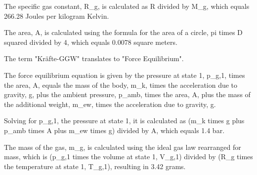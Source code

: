 The specific gas constant, R_g, is calculated as R divided by M_g, which equals 266.28 Joules per kilogram Kelvin.

The area, A, is calculated using the formula for the area of a circle, pi times D squared divided by 4, which equals 0.0078 square meters.

The term "Kräfte-GGW" translates to "Force Equilibrium".

The force equilibrium equation is given by the pressure at state 1, p_{g,1}, times the area, A, equals the mass of the body, m_k, times the acceleration due to gravity, g, plus the ambient pressure, p_{amb}, times the area, A, plus the mass of the additional weight, m_{ew}, times the acceleration due to gravity, g.

Solving for p_{g,1}, the pressure at state 1, it is calculated as (m_k times g plus p_{amb} times A plus m_{ew} times g) divided by A, which equals 1.4 bar.

The mass of the gas, m_g, is calculated using the ideal gas law rearranged for mass, which is (p_{g,1} times the volume at state 1, V_{g,1}) divided by (R_g times the temperature at state 1, T_{g,1}), resulting in 3.42 grams.